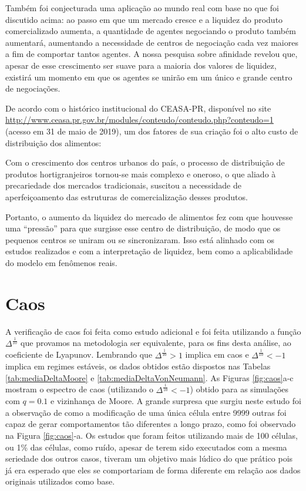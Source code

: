 \documentclass[
	12pt,				%
	openright,			%
	twoside,			%
	a4paper,			%
	english,			%
	french,				%
	spanish,			%
	brazil				%
	]{abntex2}
\begin{document}
Também foi conjecturada uma aplicação ao mundo real com base no que foi discutido acima: ao passo em que um mercado cresce e a liquidez do produto comercializado aumenta, a quantidade de agentes negociando o produto também aumentará, aumentando a necessidade de centros de negociação cada vez maiores a fim de comportar tantos agentes. A nossa pesquisa sobre afinidade revelou que, apesar de esse crescimento ser suave para a maioria dos valores de liquidez, existirá um momento em que os agentes se unirão em um único e grande centro de negociações. 

De acordo com o histórico institucional do CEASA-PR, disponível no site \url{http://www.ceasa.pr.gov.br/modules/conteudo/conteudo.php?conteudo=1} (acesso em 31 de maio de 2019), um dos fatores de sua criação foi o alto custo de distribuição dos alimentos: 
\begin{citacao}
  Com o crescimento dos centros urbanos do país, o processo de distribuição de produtos hortigranjeiros tornou-se mais complexo e oneroso, o que aliado à precariedade dos mercados tradicionais, suscitou a necessidade de aperfeiçoamento das estruturas de comercialização desses produtos.
\end{citacao}
Portanto, o aumento da liquidez do mercado de alimentos fez com que houvesse uma ``pressão'' para que surgisse esse centro de distribuição, de modo que os pequenos centros se uniram ou se sincronizaram. Isso está alinhado com os estudos realizados e com a interpretação de liquidez, bem como a aplicabilidade do modelo em fenômenos reais.

\section{Caos}

A verificação de caos foi feita como estudo adicional e foi feita utilizando a função $\Delta^\frac{1}{10}$ que provamos na metodologia ser equivalente, para os fins desta análise, ao coeficiente de Lyapunov. Lembrando que $\Delta^\frac{1}{10}>1$ implica em caos e $\Delta^\frac{1}{10}<-1$ implica em regimes estáveis, os dados obtidos estão dispostos nas Tabelas \ref{tab:mediaDeltaMoore} e \ref{tab:mediaDeltaVonNeumann}. As Figuras \ref{fig:caos}a-c mostram o espectro de caos (utilizando o $\Delta^\frac{1}{10}<-1$) obtido para as simulações com $q=0.1$ e vizinhança de Moore. A grande surpresa que surgiu neste estudo foi a observação de como a modificação de uma única célula entre 9999 outras foi capaz de gerar comportamentos tão diferentes a longo prazo, como foi observado na Figura \ref{fig:caos}-a. Os estudos que foram feitos utilizando mais de 100 células, ou 1\% das células, como ruído, apesar de terem sido executados com a mesma seriedade dos outros casos, tiveram um objetivo mais lúdico do que prático pois já era esperado que eles se comportariam de forma diferente em relação aos dados originais utilizados como base.
\end{document}
